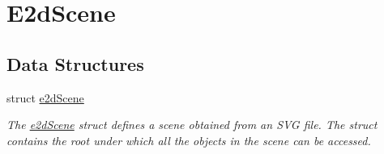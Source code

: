 \hypertarget{group__e2dScene}{\section{E2d\-Scene}
\label{group__e2dScene}
}
\subsection*{Data Structures}
\begin{DoxyCompactItemize}
\item 
struct \hyperlink{structe2dScene}{e2d\-Scene}
\begin{DoxyCompactList}\small\item\em The \hyperlink{structe2dScene}{e2d\-Scene} struct defines a scene obtained from an S\-V\-G file. The struct contains the root under which all the objects in the scene can be accessed. \end{DoxyCompactList}\end{DoxyCompactItemize}
